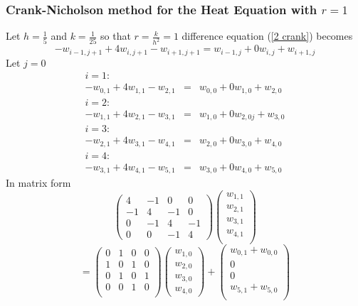 \begin{example}

\subsubsection{Crank-Nicholson method for the Heat Equation with  $r=1$}
Let $h=\frac{1}{5}$ and $k=\frac{1}{25}$ so that $r=\frac{k}{h^2}=1$
difference equation (\ref{2 crank}) becomes
\[-w_{i-1,j+1}+4w_{i,j+1}-w_{i+1,j+1}=w_{i-1,j}+0w_{i,j}+w_{i+1,j} \]
Let $j=0$
\[\begin{array}{lcl}
i=1:& &\\
-w_{0,1}+4w_{1,1}-w_{2,1}&=&w_{0,0}+0w_{1,0}+w_{2,0}\\
i=2:& &\\
-w_{1,1}+4w_{2,1}-w_{3,1}&=&w_{1,0}+0w_{2,0j}+w_{3,0}\\
i=3:& &\\
-w_{2,1}+4w_{3,1}-w_{4,1}&=&w_{2,0}+0w_{3,0}+w_{4,0}\\
i=4:& &\\
-w_{3,1}+4w_{4,1}-w_{5,1}&=&w_{3,0}+0w_{4,0}+w_{5,0}
\end{array}\]
In matrix form
\[\left(\begin{array}{cccc}
4&-1&0&0\\
-1&4&-1&0\\
0&-1&4&-1\\
0&0&-1&4
\end{array}
\right)
\left(\begin{array}{c}
w_{1,1}\\
w_{2,1}\\
w_{3,1}\\
w_{4,1}\\
\end{array}
\right)\]
\[=\left(\begin{array}{cccc}
0&1&0&0\\
1&0&1&0\\
0&1&0&1\\
0&0&1&0\\

\end{array}
\right)
\left(\begin{array}{c}
w_{1,0}\\
w_{2,0}\\
w_{3,0}\\
w_{4,0}
\end{array}
\right)+
\left(\begin{array}{c}
w_{0,1}+w_{0,0}\\
0\\
0\\
w_{5,1}+w_{5,0}\\
\end{array}
\right)
\]	





\end{example}
